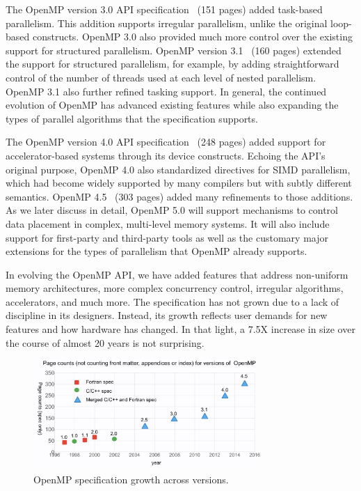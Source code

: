 The OpenMP version 3.0 API specification~\cite{openmp3} (151 pages) added
task-based parallelism. This addition supports irregular parallelism, unlike 
the original loop-based constructs. OpenMP 3.0 also provided much more control
over the existing support for structured parallelism. OpenMP 
version 3.1~\cite{openmp31} (160 pages) extended the support for structured 
parallelism, for example, by adding straightforward control of the number of 
threads used at each level of nested parallelism. OpenMP 3.1 also further 
refined tasking support. In general, the continued evolution of OpenMP has 
advanced existing features while also expanding the types of parallel 
algorithms that the specification supports.

The OpenMP version 4.0 API specification~\cite{openmp4} (248 pages) added 
support for accelerator-based systems through its device constructs. Echoing 
the API's original purpose, OpenMP 4.0 also standardized directives for SIMD 
parallelism, which had become widely supported by many compilers but with 
subtly different semantics. OpenMP 4.5~\cite{openmp45} (303 pages) added many 
refinements to those additions. As we later discuss in detail, OpenMP 5.0 will
support mechanisms to control data placement in complex, multi-level memory 
systems. It will also include support for first-party and third-party tools 
as well as the customary major extensions for the types of parallelism that
OpenMP already supports.

In evolving the OpenMP API, we have added features that address 
non-uniform memory architectures, more complex concurrency control, 
irregular algorithms, accelerators, and much more. The specification 
has not grown due to a lack of discipline in its designers. Instead,
its growth reflects user demands for new features and how hardware 
has changed. In that light, a 7.5X increase in size over the course 
of almost 20 years is not surprising.

\begin{figure}
  \centering
  \includegraphics[width=3.4in]{pics/opcounts.png}
  \caption{OpenMP specification growth across versions.\label{omppcount}}
\end{figure}


